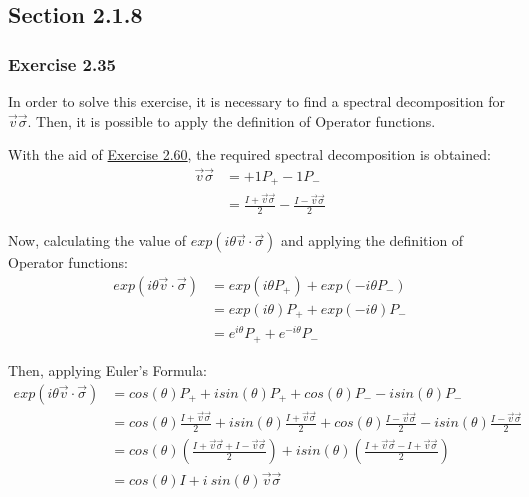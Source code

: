 \subsection{Section 2.1.8}
\subsubsection{Exercise 2.35}
\label{sec:nielsen-and-chuang-exercise-2-35}
    In order to solve this exercise,
    it is necessary to find a spectral decomposition for $\vec{v} \vec{\sigma}$.
    Then, it is possible to apply the definition of Operator functions.
    
    With the aid of \hyperref[sec:nielsen-and-chuang-exercise-2-60]{Exercise 2.60},
    the required spectral decomposition is obtained:
    \begin{align}
        \vec{v}\vec{\sigma} &= +1 P_+ -1 P_- \\
        &= \frac{I + \vec{v}\vec{\sigma}}{2} - \frac{I - \vec{v}\vec{\sigma}}{2}
    \end{align}
    
    Now, calculating the value of $exp(i \theta \vec{v}\cdot\vec{\sigma})$
    and applying the definition of Operator functions:
    \begin{align}
        exp(i \theta \vec{v}\cdot\vec{\sigma}) &=
            exp(i \theta P_+) + exp(-i \theta P_-) \\
        &= exp(i \theta) P_+ + exp(-i \theta) P_- \\
        &= e^{i \theta} P_+ + e^{-i \theta} P_-
    \end{align}
    
    Then, applying Euler's Formula:
    \begin{align}
        exp(i \theta \vec{v}\cdot\vec{\sigma}) &=
            cos(\theta)P_+ + i sin(\theta)P_+ +
            cos(\theta)P_- - i sin(\theta)P_- \\
        &= cos(\theta)\frac{I + \vec{v}\vec{\sigma}}{2} +
            i sin(\theta)\frac{I + \vec{v}\vec{\sigma}}{2} +
            cos(\theta)\frac{I - \vec{v}\vec{\sigma}}{2} -
            i sin(\theta)\frac{I - \vec{v}\vec{\sigma}}{2} \\
        &= cos(\theta) \left(
                \frac{I + \vec{v}\vec{\sigma} + I - \vec{v}\vec{\sigma}}{2}
            \right)
            + i sin(\theta) \left(
                \frac{I + \vec{v}\vec{\sigma} - I + \vec{v}\vec{\sigma}}{2}
            \right) \\
        &= cos(\theta) I + i\ sin(\theta) \vec{v}\vec{\sigma}
    \end{align}
    
